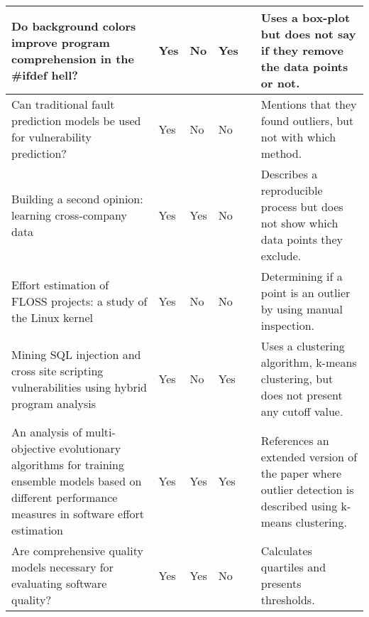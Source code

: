 \begin{landscape}
\begin{longtabu} {X[3]XXXXX[2]}
Do background colors improve program comprehension in the \#ifdef hell?\strut                                                                                   & Yes                       & No & Yes                        & \citet{feigenspan2013background} & Uses a box-plot but does not say if they remove the data points or not.\strut
\\ \hline

Can traditional fault prediction models be used for vulnerability prediction?\strut                                                                             & Yes                       & No & No                        & \citet{shin2013can}              & Mentions that they found outliers, but not with which method.\strut
\\ \hline

Building a second opinion: learning cross-company data\strut                                                                                                    & Yes                       & Yes & No                        & \citet{kocaguneli2013building}   & Describes a reproducible process but does not show which data points they exclude.\strut                      \\ \hline
Effort estimation of FLOSS projects: a study of the Linux kernel\strut                                                                                          & Yes                       & No & No                        & \citet{capiluppi2013effort}      & Determining if a point is an outlier by using manual inspection.\strut
\\ \hline

Mining SQL injection and cross site scripting vulnerabilities using hybrid program analysis\strut                                                               & Yes                       & No & Yes                        & \citet{shar2013mining}           & Uses a clustering algorithm, k-means clustering, but does not present any cutoff value.\strut
\\ \hline

An analysis of multi-objective evolutionary algorithms for training ensemble models based on different performance measures in software effort estimation\strut & Yes                       & Yes & Yes                        & \citet{minku2013analysis}        & References an extended version of the paper where outlier detection is described using k-means clustering.\strut
\\ \hline

Are comprehensive quality models necessary for evaluating software quality?\strut                                                                                & Yes                       & Yes & No                       & \citet{lochmann2013comprehensive}  & Calculates quartiles and presents thresholds.\strut
\\ \hline


\end{longtabu}
\end{landscape}
